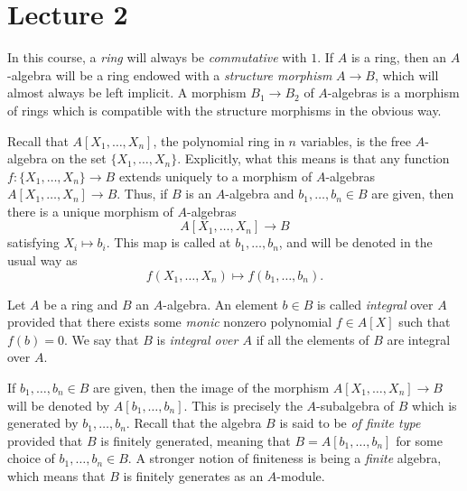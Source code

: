 \section{Lecture 2}

In this course, a \emph{ring} will always be \emph{commutative} with $1$.
If $A$ is a ring, then an $A$-algebra will be a ring endowed with a \emph{structure morphism} $A \to B$, which will almost always be left implicit.
A morphism $B_{1} \to B_{2}$ of $A$-algebras is a morphism of rings which is compatible with the structure morphisms in the obvious way.

Recall that $A[X_{1},\ldots,X_{n}]$, the polynomial ring in $n$ variables, is the free $A$-algebra on the set $\{X_{1},\ldots,X_{n}\}$.
Explicitly, what this means is that any function $f : \{X_1,\ldots,X_n\} \to B$ extends uniquely to a morphism of $A$-algebras $A[X_1,\ldots,X_n] \to B$.
Thus, if $B$ is an $A$-algebra and $b_{1},\ldots,b_{n} \in B$ are given, then there is a unique morphism of $A$-algebras
\[ A[X_{1},\ldots,X_{n}] \to B \]
satisfying $X_{i} \mapsto b_{i}$.
This map is called  at $b_{1},\ldots,b_{n}$, and will be denoted in the usual way as
\[ f(X_{1},\ldots,X_{n}) \mapsto f(b_{1},\ldots,b_{n}). \]


\begin{definition}
  Let $A$ be a ring and $B$ an $A$-algebra.
  An element $b \in B$ is called \emph{integral} over $A$ provided that there exists some \emph{monic} nonzero polynomial $f \in A[X]$ such that $f(b) = 0$.
  We say that $B$ is \emph{integral over $A$} if all the elements of $B$ are integral over $A$.
\end{definition}

If $b_{1},\ldots,b_{n} \in B$ are given, then the image of the morphism $A[X_{1},\ldots,X_{n}] \to B$ will be denoted by $A[b_{1},\ldots,b_{n}]$.
This is precisely the $A$-subalgebra of $B$ which is generated by $b_{1},\ldots,b_{n}$.
Recall that the algebra $B$ is said to be \emph{of finite type} provided that $B$ is finitely generated, meaning that $B = A[b_{1},\ldots,b_{n}]$ for some choice of $b_{1},\ldots,b_{n} \in B$.
A stronger notion of finiteness is being a \emph{finite} algebra, which means that $B$ is finitely generates as an $A$-module.

